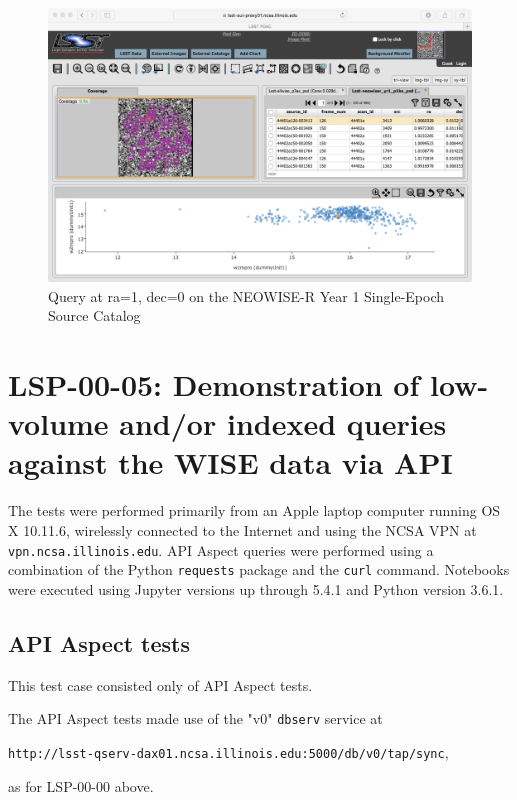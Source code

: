 \documentclass[DM,lsstdraft,STR,toc]{lsstdoc}
\begin{document}
\begin{figure}
  \includegraphics[width=\linewidth]{lsp-00-00/Portal-neowiser_yr1_p1bs_psd.png}
  \caption{Query at ra=1, dec=0 on the NEOWISE-R Year 1 Single-Epoch Source Catalog}
  \label{fig:portal-query-neowiser-psd}
\end{figure}


\section{LSP-00-05: Demonstration of low-volume and/or indexed queries against the WISE data via API}
\label{sect:detail-lsp-00-05}

The tests were performed primarily from an Apple laptop computer running OS X 10.11.6,
wirelessly connected to the Internet and using the NCSA VPN at \texttt{vpn.ncsa.illinois.edu}.
API Aspect queries were performed using a combination of the Python \texttt{requests} package and the \texttt{curl} command.
Notebooks were executed using Jupyter versions up through 5.4.1 and Python version 3.6.1.

\subsection{API Aspect tests}

This test case consisted only of API Aspect tests.

The API Aspect tests made use of the "v0" \texttt{dbserv} service at 

\begin{center}
\texttt{http://lsst-qserv-dax01.ncsa.illinois.edu:5000/db/v0/tap/sync},
\end{center}

as for LSP-00-00 above.
\end{document}
